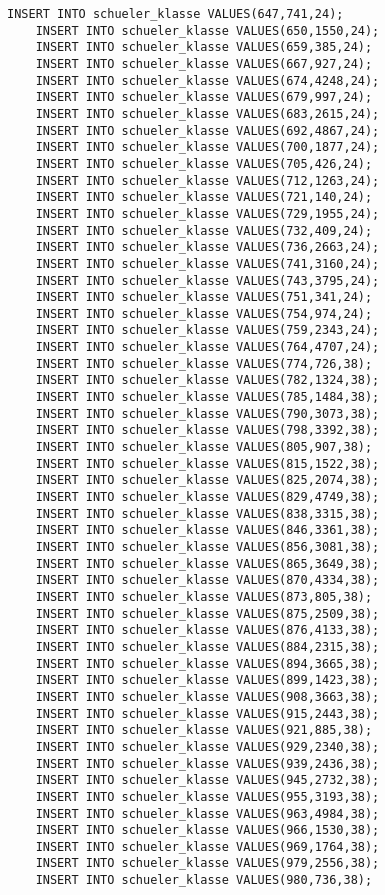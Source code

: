 \begin{lstlisting}[breaklines=True, numbers=none, basicstyle=\tiny, keepspaces=false]
	INSERT INTO schueler_klasse VALUES(647,741,24);
	INSERT INTO schueler_klasse VALUES(650,1550,24);
	INSERT INTO schueler_klasse VALUES(659,385,24);
	INSERT INTO schueler_klasse VALUES(667,927,24);
	INSERT INTO schueler_klasse VALUES(674,4248,24);
	INSERT INTO schueler_klasse VALUES(679,997,24);
	INSERT INTO schueler_klasse VALUES(683,2615,24);
	INSERT INTO schueler_klasse VALUES(692,4867,24);
	INSERT INTO schueler_klasse VALUES(700,1877,24);
	INSERT INTO schueler_klasse VALUES(705,426,24);
	INSERT INTO schueler_klasse VALUES(712,1263,24);
	INSERT INTO schueler_klasse VALUES(721,140,24);
	INSERT INTO schueler_klasse VALUES(729,1955,24);
	INSERT INTO schueler_klasse VALUES(732,409,24);
	INSERT INTO schueler_klasse VALUES(736,2663,24);
	INSERT INTO schueler_klasse VALUES(741,3160,24);
	INSERT INTO schueler_klasse VALUES(743,3795,24);
	INSERT INTO schueler_klasse VALUES(751,341,24);
	INSERT INTO schueler_klasse VALUES(754,974,24);
	INSERT INTO schueler_klasse VALUES(759,2343,24);
	INSERT INTO schueler_klasse VALUES(764,4707,24);
	INSERT INTO schueler_klasse VALUES(774,726,38);
	INSERT INTO schueler_klasse VALUES(782,1324,38);
	INSERT INTO schueler_klasse VALUES(785,1484,38);
	INSERT INTO schueler_klasse VALUES(790,3073,38);
	INSERT INTO schueler_klasse VALUES(798,3392,38);
	INSERT INTO schueler_klasse VALUES(805,907,38);
	INSERT INTO schueler_klasse VALUES(815,1522,38);
	INSERT INTO schueler_klasse VALUES(825,2074,38);
	INSERT INTO schueler_klasse VALUES(829,4749,38);
	INSERT INTO schueler_klasse VALUES(838,3315,38);
	INSERT INTO schueler_klasse VALUES(846,3361,38);
	INSERT INTO schueler_klasse VALUES(856,3081,38);
	INSERT INTO schueler_klasse VALUES(865,3649,38);
	INSERT INTO schueler_klasse VALUES(870,4334,38);
	INSERT INTO schueler_klasse VALUES(873,805,38);
	INSERT INTO schueler_klasse VALUES(875,2509,38);
	INSERT INTO schueler_klasse VALUES(876,4133,38);
	INSERT INTO schueler_klasse VALUES(884,2315,38);
	INSERT INTO schueler_klasse VALUES(894,3665,38);
	INSERT INTO schueler_klasse VALUES(899,1423,38);
	INSERT INTO schueler_klasse VALUES(908,3663,38);
	INSERT INTO schueler_klasse VALUES(915,2443,38);
	INSERT INTO schueler_klasse VALUES(921,885,38);
	INSERT INTO schueler_klasse VALUES(929,2340,38);
	INSERT INTO schueler_klasse VALUES(939,2436,38);
	INSERT INTO schueler_klasse VALUES(945,2732,38);
	INSERT INTO schueler_klasse VALUES(955,3193,38);
	INSERT INTO schueler_klasse VALUES(963,4984,38);
	INSERT INTO schueler_klasse VALUES(966,1530,38);
	INSERT INTO schueler_klasse VALUES(969,1764,38);
	INSERT INTO schueler_klasse VALUES(979,2556,38);
	INSERT INTO schueler_klasse VALUES(980,736,38);

\end{lstlisting}
